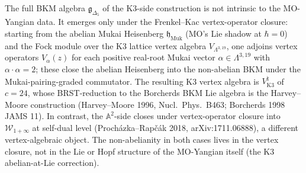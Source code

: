 \begin{remark}
\label{rem:fsc-K3-vs-A2-vertex-closure}
The full BKM algebra $\mathfrak{g}_{\Delta_5}$ of the K3-side
construction is not intrinsic to the MO-Yangian data. It emerges only
under the Frenkel--Kac vertex-operator closure: starting from the
abelian Mukai Heisenberg $\mathfrak{h}_{\mathrm{Muk}}$ (MO's Lie
shadow at $\hbar = 0$) and the Fock module over the K3 lattice
vertex algebra $V_{\Lambda^{3,19}}$, one adjoins vertex operators
$V_\alpha(z)$ for each positive real-root Mukai vector
$\alpha \in \Lambda^{3,19}$ with $\alpha \cdot \alpha = 2$; these
close the abelian Heisenberg into the non-abelian BKM under the
Mukai-pairing-graded commutator. The resulting K3 vertex algebra is
$V^\natural_{\mathrm K3}$ of $c = 24$, whose BRST-reduction to the
Borcherds BKM Lie algebra is the Harvey--Moore construction
(Harvey--Moore 1996, Nucl.~Phys.~B463; Borcherds 1998 JAMS 11).
In contrast, the $\mathbb A^2$-side closes under vertex-operator
closure into $\mathcal{W}_{1+\infty}$ at self-dual level
(Proch\'azka--Rap\v{c}\'ak 2018, arXiv:1711.06888), a different
vertex-algebraic object. The non-abelianity in both cases lives in
the vertex closure, not in the Lie or Hopf structure of the MO-Yangian
itself (the K3 abelian-at-Lie correction).
\end{remark}

